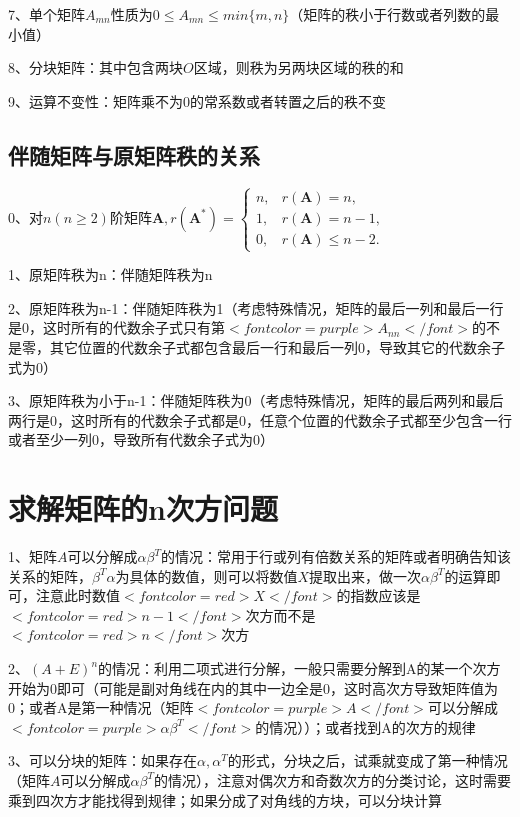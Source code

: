 7、单个矩阵$ A_{mn} $性质为$ 0 \leqslant A_{mn} \leqslant min\{ m,n \} $（矩阵的秩小于行数或者列数的最小值）

8、分块矩阵：其中包含两块$ O $区域，则秩为另两块区域的秩的和

9、运算不变性：矩阵乘不为0的常系数或者转置之后的秩不变



\subsection{伴随矩阵与原矩阵秩的关系}

0、对$ n(n \geqslant 2) $阶矩阵$ \boldsymbol{A}, r\left(\boldsymbol{A}^{*}\right)= \begin{cases}n, & r(\boldsymbol{A})=n, \\ 1, & r(\boldsymbol{A})=n-1, \\ 0, & r(\boldsymbol{A}) \leqslant n-2 .\end{cases} $

1、原矩阵秩为n：伴随矩阵秩为n

2、原矩阵秩为n-1：伴随矩阵秩为1（考虑特殊情况，矩阵的最后一列和最后一行是0，这时所有的代数余子式只有第$ <font color=purple>A_{nn}</font> $的不是零，其它位置的代数余子式都包含最后一行和最后一列0，导致其它的代数余子式为0）

3、原矩阵秩为小于n-1：伴随矩阵秩为0（考虑特殊情况，矩阵的最后两列和最后两行是0，这时所有的代数余子式都是0，任意个位置的代数余子式都至少包含一行或者至少一列0，导致所有代数余子式为0）

\section{求解矩阵的n次方问题}

1、矩阵$ A $可以分解成$ \alpha\beta^T $的情况：常用于行或列有倍数关系的矩阵或者明确告知该关系的矩阵，$ \beta^T\alpha $为具体的数值，则可以将数值$ X $提取出来，做一次$ \alpha\beta^T $的运算即可，注意此时数值$ <font color=red>X</font> $的指数应该是$ <font color=red>n-1</font> $次方而不是$ <font color=red>n</font> $次方

2、$ (A+E)^n $的情况：利用二项式进行分解，一般只需要分解到A的某一个次方开始为0即可（可能是副对角线在内的其中一边全是0，这时高次方导致矩阵值为0；或者A是第一种情况（矩阵$ <font color=purple>A</font> $可以分解成$ <font color=purple>\alpha\beta^T</font> $的情况））；或者找到A的次方的规律

3、可以分块的矩阵：如果存在$ \alpha,\alpha^T $的形式，分块之后，试乘就变成了第一种情况（矩阵$ A $可以分解成$ \alpha\beta^T $的情况），注意对偶次方和奇数次方的分类讨论，这时需要乘到四次方才能找得到规律；如果分成了对角线的方块，可以分块计算


